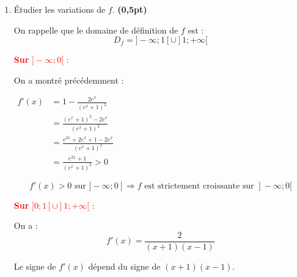 \documentclass[12pt,a4paper]{article}
\begin{document}
\begin{enumerate}
\textcolor{red}{\textbf{Sur } \( ]-\infty ; 0[ \)} :

Pour \( x < 0 \), on a :
\[
f(x) = x - \frac{e^x - 1}{e^x + 1} \text{ou encore} f(x) = x+1 - \frac{2e^x}{e^x + 1}
\]

\[
f'(x)=1 - \frac{2e^x (e^x + 1) - (e^x )(2e^x)}{(e^x + 1)^2}
=1- \frac{2e^x(e^x + 1 - e^x )}{(e^x + 1)^2}
=1- \frac{2e^x}{(e^x + 1)^2}
\]

Donc :
\[
f'(x) = 1 - \frac{2e^x}{(e^x + 1)^2}
\]

\begin{resultbox}
\[
f'(x) =
\begin{cases}
\displaystyle \frac{2}{(x + 1)(x - 1)} & \text{si } x \in ]0 ; 1[ \cup ]1 ; +\infty[ \\
\\
\displaystyle 1 - \frac{2e^x}{(e^x + 1)^2} & \text{si } x \in ]-\infty ; 0[
\end{cases}
\]
\end{resultbox}

\item Étudier les variations de \( f \). \hfill \textbf{(0,5pt)}

On rappelle que le domaine de définition de \( f \) est :
\[
D_f = ]-\infty ; 1[ \cup ]1 ; +\infty[
\]

\textcolor{red}{\textbf{Sur } \( ]-\infty ; 0[ \)} :

On a montré précédemment :

\(
\begin{aligned}
    f'(x) &= 1 - \frac{2e^x}{(e^x + 1)^2}\\
          &=\frac{(e^x + 1)^2-2e^x}{(e^x + 1)^2}\\
          &=\frac{e^{2x}+2e^x+1-2e^{x}}{(e^x + 1)^2}\\
          &=\frac{e^{2x}+1}{(e^x + 1)^2}>0
\end{aligned}
\)

\[
f'(x) > 0 \text{ sur } ]-\infty ; 0[
\Rightarrow f \text{ est strictement croissante sur } ]-\infty ; 0[
\]

\vspace{1em}

\textcolor{red}{\textbf{Sur } \( ]0 ; 1[ \cup ]1 ; +\infty[ \)} :

On a :
\[
f'(x) = \frac{2}{(x + 1)(x - 1)}
\]

Le signe de \( f'(x) \) dépend du signe de \( (x + 1)(x - 1) \).



\end{enumerate}
\end{document}
